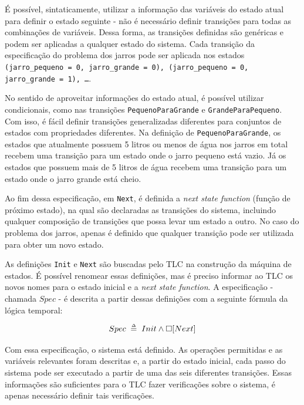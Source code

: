 É possível, sintaticamente, utilizar a informação das variáveis do estado atual para definir o estado seguinte - não é necessário definir transições para todas as combinações de variáveis. Dessa forma, as transições definidas são genéricas e podem ser aplicadas a qualquer estado do sistema. Cada transição da especificação do problema dos jarros pode ser aplicada nos estados \texttt{(jarro\_pequeno = 0, jarro\_grande = 0), (jarro\_pequeno = 0, jarro\_grande = 1), \dots}.

No sentido de aproveitar informações do estado atual, é possível utilizar condicionais, como nas transições \texttt{PequenoParaGrande} e \texttt{GrandeParaPequeno}. Com isso, é fácil definir transições generalizadas diferentes para conjuntos de estados com propriedades diferentes. Na definição de \texttt{PequenoParaGrande}, os estados que atualmente possuem 5 litros ou menos de água nos jarros em total recebem uma transição para um estado onde o jarro pequeno está vazio. Já os estados que possuem mais de 5 litros de água recebem uma transição para um estado onde o jarro grande está cheio.

Ao fim dessa especificação, em \texttt{Next}, é definida a \textit{next state function} (função de próximo estado), na qual são declaradas as transições do sistema, incluindo qualquer composição de transições que possa levar um estado a outro. No caso do problema dos jarros, apenas é definido que qualquer transição pode ser utilizada para obter um novo estado.

As definições \texttt{Init} e \texttt{Next} são buscadas pelo TLC na construção da máquina de estados. É possível renomear essas definições, mas é preciso informar ao TLC os novos nomes para o estado inicial e a \textit{next state function}. A especificação - chamada $Spec$ - é descrita a partir dessas definições com a seguinte fórmula da lógica temporal:

\[Spec \;\mathrel{\smash {{\stackrel{\scriptscriptstyle\Delta}{=}}}}\; Init \land \square [Next]\]

Com essa especificação, o sistema está definido. As operações permitidas e as variáveis relevantes foram descritas e, a partir do estado inicial, cada passo do sistema pode ser executado a partir de uma das seis diferentes transições. Essas informações são suficientes para o TLC fazer verificações sobre o sistema, é apenas necessário definir tais verificações.

